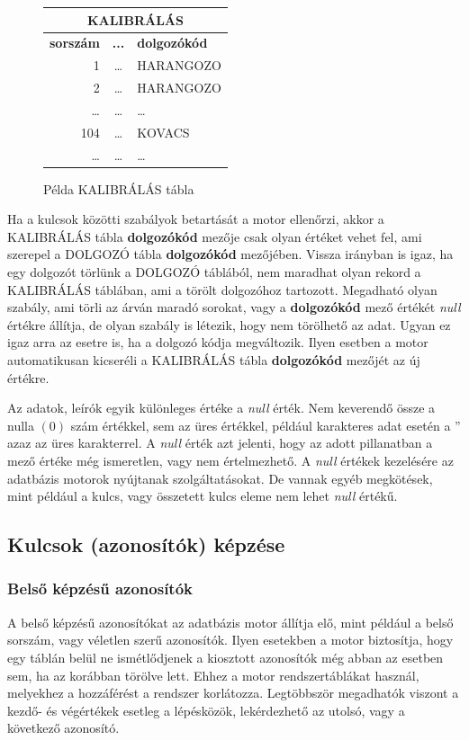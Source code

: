\documentclass[a4paper,12pt]{report}
\begin{document}
\begin{figure}[ht!]\centering

\begin{tabular}{|r|c|l|}
        \hline
        \multicolumn{3}{|c|}{\textbf{KALIBRÁLÁS}}\\
        \hline
        \textbf{sorszám}&\textbf{...}&\textbf{dolgozókód}\\
        \hline
        1&\dots&HARANGOZO\\
        \hline
        2&\dots&HARANGOZO\\
        \hline
        \dots&\dots&\dots\\
        \hline
        104&\dots&KOVACS\\
        \hline
        \dots&\dots&\dots\\
\end{tabular}
\caption{Példa KALIBRÁLÁS tábla}\label{kalib}
\end{figure}
        

Ha a kulcsok közötti szabályok betartását a motor ellenőrzi, akkor a KALIBRÁLÁS 
tábla \textbf{dolgozókód} mezője csak olyan értéket vehet fel, ami szerepel a 
DOLGOZÓ tábla \textbf{dolgozókód} mezőjében. Vissza irányban is igaz, ha egy 
dolgozót törlünk a DOLGOZÓ táblából, nem maradhat olyan rekord a KALIBRÁLÁS 
táblában, ami a törölt dolgozóhoz tartozott. Megadható olyan szabály, ami törli 
az árván maradó sorokat, vagy a \textbf{dolgozókód} mező értékét \textit{null} 
értékre állítja, de olyan szabály is létezik, hogy nem törölhető az adat.
Ugyan ez igaz arra az esetre is, ha a dolgozó kódja megváltozik. Ilyen esetben 
a motor automatikusan kicseréli a KALIBRÁLÁS tábla \textbf{dolgozókód} mezőjét 
az új értékre.

Az adatok, leírók egyik különleges értéke a \textit{null} érték. Nem keverendő
össze a nulla $(0)$ szám értékkel, sem az üres értékkel, például karakteres
adat esetén a '' azaz az üres karakterrel. A \textit{null} érték azt jelenti, 
hogy az adott pillanatban a mező értéke még ismeretlen, vagy nem értelmezhető.
A \textit{null} értékek kezelésére az adatbázis motorok nyújtanak 
szolgáltatásokat. De vannak egyéb megkötések, mint például a kulcs, vagy 
összetett kulcs eleme nem lehet \textit{null} értékű.

\subsection{Kulcsok (azonosítók) képzése}

\subsubsection{Belső képzésű azonosítók}
A belső képzésű azonosítókat az adatbázis motor állítja elő, mint például a 
belső sorszám, vagy véletlen szerű azonosítók. Ilyen esetekben a motor 
biztosítja, hogy egy táblán belül ne ismétlődjenek a kiosztott azonosítók még 
abban az esetben sem, ha az korábban törölve lett. Ehhez a motor 
rendszertáblákat használ, melyekhez a hozzáférést a rendszer korlátozza. 
Legtöbbször megadhatók viszont a kezdő- és végértékek esetleg a lépésközök, 
lekérdezhető az utolsó, vagy a következő azonosító.
\end{document}
